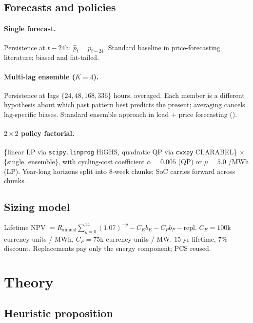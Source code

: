 \documentclass[11pt]{article}
\begin{document}
\subsection{Forecasts and policies}

\paragraph{Single forecast.} Persistence at $t-24$h: $\hat{p}_t = p_{t-24}$. Standard baseline in price-forecasting literature; biased and fat-tailed.

\paragraph{Multi-lag ensemble ($K{=}4$).} Persistence at lags $\{24, 48, 168, 336\}$ hours, averaged. Each member is a different hypothesis about which past pattern best predicts the present; averaging cancels lag-specific biases. Standard ensemble approach in load + price forecasting (\citealp{hong2014global, weron2014electricity}).

\paragraph{$2 \times 2$ policy factorial.} \{linear LP via \texttt{scipy.linprog} HiGHS, quadratic QP via \texttt{cvxpy} CLARABEL\} $\times$ \{single, ensemble\}, with cycling-cost coefficient $\alpha = 0.005$ (QP) or $\mu = 5.0$ /MWh (LP). Year-long horizons split into 8-week chunks; SoC carries forward across chunks.

\subsection{Sizing model}

Lifetime NPV $= R_{\mathrm{annual}} \sum_{y=0}^{14} (1.07)^{-y} - C_E b_E - C_P b_P - \mathrm{repl}$. $C_E = 100$k currency-units / MWh, $C_P = 75$k currency-units / MW. 15-yr lifetime, 7\% discount. Replacements pay only the energy component; PCS reused.

\section{Theory}\label{sec:theory}

\subsection{Heuristic proposition}
\end{document}
